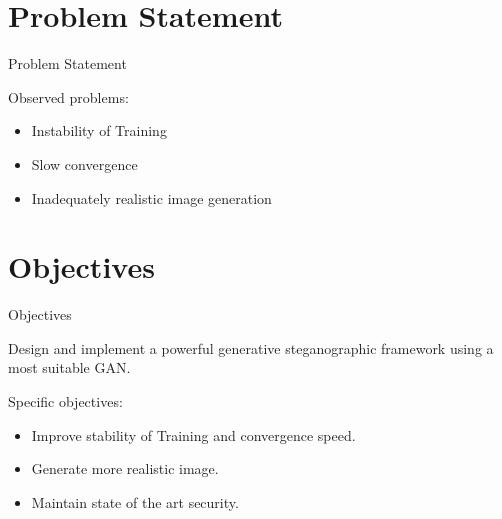 \documentclass[11pt]{beamer}
\begin{document}
\section{Problem Statement}
\begin{frame}{Problem Statement} %
	
	
	Observed problems: 
	\begin{itemize}
		\item Instability of Training
		\item Slow convergence
		\item Inadequately realistic image generation
	\end{itemize}

\pause
{}

\end{frame}

\section{Objectives}
\begin{frame}{Objectives} %

	Design and implement a powerful generative steganographic framework using a
most suitable GAN.
\end{frame}

\begin{frame} %
	
	Specific objectives:
	\begin{itemize}
		\item <1-> Improve stability of Training and convergence speed.
		\item <2-> Generate more realistic image.
		\item <3-> Maintain state of the art security.
	\end{itemize}
	
\end{frame}
\end{document}
